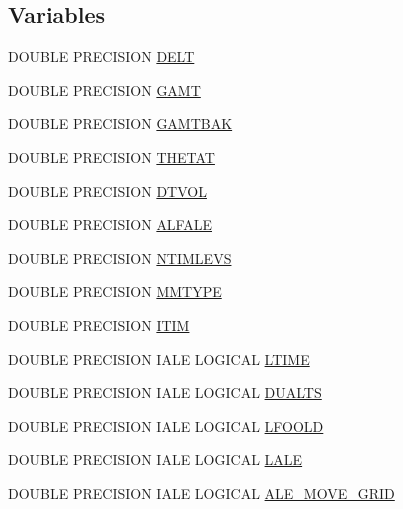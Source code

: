 \subsection*{Variables}
\begin{DoxyCompactItemize}
\item 
D\-O\-U\-B\-L\-E P\-R\-E\-C\-I\-S\-I\-O\-N \hyperlink{time_8com_a5513a2d02244417f197860f9d142b7a4}{D\-E\-L\-T}
\item 
D\-O\-U\-B\-L\-E P\-R\-E\-C\-I\-S\-I\-O\-N \hyperlink{time_8com_afdf546d0ac261dc8969599f6c2786ea3}{G\-A\-M\-T}
\item 
D\-O\-U\-B\-L\-E P\-R\-E\-C\-I\-S\-I\-O\-N \hyperlink{time_8com_a25bf5617cd66a62825fec4d14e7f4023}{G\-A\-M\-T\-B\-A\-K}
\item 
D\-O\-U\-B\-L\-E P\-R\-E\-C\-I\-S\-I\-O\-N \hyperlink{time_8com_a0752af9342b68501fff493175f88f86e}{T\-H\-E\-T\-A\-T}
\item 
D\-O\-U\-B\-L\-E P\-R\-E\-C\-I\-S\-I\-O\-N \hyperlink{time_8com_a087a706518b222edc1a8cb57a895a4b8}{D\-T\-V\-O\-L}
\item 
D\-O\-U\-B\-L\-E P\-R\-E\-C\-I\-S\-I\-O\-N \hyperlink{time_8com_a301a6f358262caf59cbce1fdcd16a82b}{A\-L\-F\-A\-L\-E}
\item 
D\-O\-U\-B\-L\-E P\-R\-E\-C\-I\-S\-I\-O\-N \hyperlink{time_8com_a6fd76fb7d397612fe162f096d76afc1f}{N\-T\-I\-M\-L\-E\-V\-S}
\item 
D\-O\-U\-B\-L\-E P\-R\-E\-C\-I\-S\-I\-O\-N \hyperlink{time_8com_a7cab4e82cd8529facf6a2802f81887ff}{M\-M\-T\-Y\-P\-E}
\item 
D\-O\-U\-B\-L\-E P\-R\-E\-C\-I\-S\-I\-O\-N \hyperlink{time_8com_a05b1a0581c155d7e49853c3808fe94c9}{I\-T\-I\-M}
\item 
D\-O\-U\-B\-L\-E P\-R\-E\-C\-I\-S\-I\-O\-N I\-A\-L\-E L\-O\-G\-I\-C\-A\-L \hyperlink{time_8com_a5194e009f554c771a956f03d9c6b3acd}{L\-T\-I\-M\-E}
\item 
D\-O\-U\-B\-L\-E P\-R\-E\-C\-I\-S\-I\-O\-N I\-A\-L\-E L\-O\-G\-I\-C\-A\-L \hyperlink{time_8com_ae9c8c0b7bb2bebb11e2e8e8f7c8c86b7}{D\-U\-A\-L\-T\-S}
\item 
D\-O\-U\-B\-L\-E P\-R\-E\-C\-I\-S\-I\-O\-N I\-A\-L\-E L\-O\-G\-I\-C\-A\-L \hyperlink{time_8com_a8f1c291f9e9b0f1c287055044411b18e}{L\-F\-O\-O\-L\-D}
\item 
D\-O\-U\-B\-L\-E P\-R\-E\-C\-I\-S\-I\-O\-N I\-A\-L\-E L\-O\-G\-I\-C\-A\-L \hyperlink{time_8com_ad4ab8d0cb1447f972537eb518a71c20b}{L\-A\-L\-E}
\item 
D\-O\-U\-B\-L\-E P\-R\-E\-C\-I\-S\-I\-O\-N I\-A\-L\-E L\-O\-G\-I\-C\-A\-L \hyperlink{time_8com_a79d4ed5b7dbe392dedceb5e31c270401}{A\-L\-E\-\_\-\-M\-O\-V\-E\-\_\-\-G\-R\-I\-D}

\end{DoxyCompactItemize}
